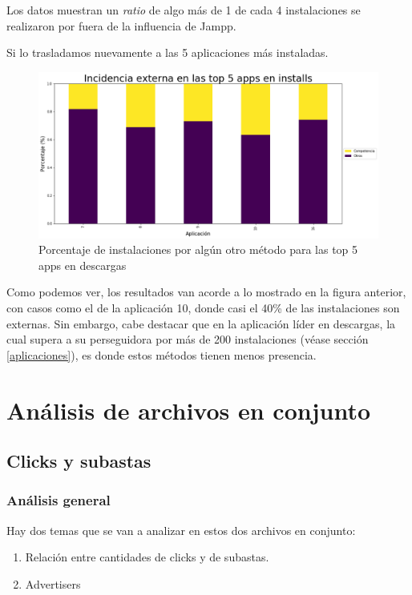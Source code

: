 \documentclass[a4paper, 12pt]{article}
\newcommand\tab[1][1cm]{\hspace*{#1}}
\begin{document}
		Los datos muestran un \textit{ratio} de algo más de 1 de cada 4 instalaciones se realizaron por fuera de la influencia de Jampp.

		Si lo trasladamos nuevamente a las 5 aplicaciones más instaladas.

		\FloatBarrier
		\begin{figure}[h]
			\centering
			\includegraphics[width=\textwidth]{images/installs/incidenciacomp.png}
			\caption{Porcentaje de instalaciones por algún otro método para las top 5 apps en descargas}
		\end{figure}
		\FloatBarrier

		Como podemos ver, los resultados van acorde a lo mostrado en la figura anterior, con casos como el de la aplicación 10, donde casi el 40\% de las instalaciones son externas. Sin embargo, cabe destacar que en la aplicación líder en descargas, la cual supera a su perseguidora por más de 200 instalaciones (véase sección \ref{aplicaciones}), es donde estos métodos tienen menos presencia.

\clearpage
\section{Análisis de archivos en conjunto}
\subsection{Clicks y subastas}
	\subsubsection{Análisis general}
	\tab Hay dos temas que se van a analizar en estos dos archivos en conjunto:
	\begin{enumerate}
		\item Relación entre cantidades de clicks y de subastas.
		\item Advertisers
	\end{enumerate}
\end{document}
